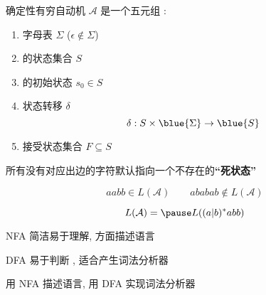 \begin{frame}{}
  \begin{definition}
    确定性有穷自动机 $\mathcal{A}$ 是一个五元组
    :

    \vspace{0.30cm}
    \begin{enumerate}[(1)]
      \item 字母表 $\Sigma$ ($\epsilon \notin \Sigma$)
      \item {}的状态集合 $S$
      \item {}的初始状态 $s_{0} \in S$
      \item 状态转移 $\delta$
        \[
          \delta: S \times \blue{\Sigma} \to \blue{S}
        \]
      \item 接受状态集合 $F \subseteq S$
    \end{enumerate}
  \end{definition}


  \pause
  \begin{center}
     所有没有对应出边的字符默认指向一个不存在的{\bf ``死状态''}
  \end{center}
\end{frame}

\begin{frame}{}

  \[
    aabb \in L(\mathcal{A}) \qquad ababab \notin L(\mathcal{A})
  \]

  \pause
  \[
    L(\mathcal{A}) = \pause L((a|b)^{\ast}abb)
  \]

  \pause
\end{frame}

\begin{frame}{}
  \begin{center}
    NFA 简洁易于理解, 方面描述语言 

    \vspace{0.30cm}
    DFA 易于判断 , 适合产生词法分析器

    \pause
    \vspace{1.20cm}
    用 NFA 描述语言, 用 DFA 实现词法分析器

    \vspace{0.30cm}
  \end{center}
\end{frame}
